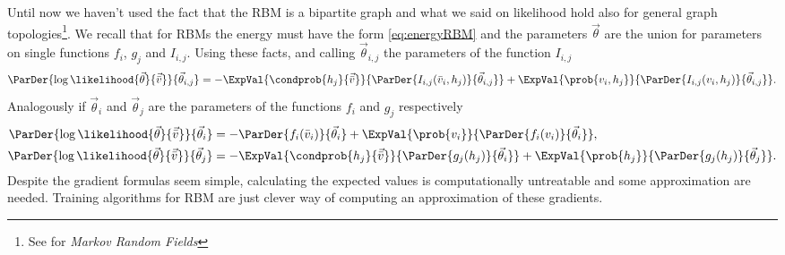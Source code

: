 \documentclass[]{article}
\begin{document}
  Until now we haven't used the fact that the RBM is a bipartite graph and what we said on likelihood
  hold also for general graph topologies\footnote{See \cite{fischer2012introduction} for \emph{Markov
  Random Fields}}.
  We recall that for RBMs the energy must have the form \eqref{eq:energyRBM} and the parameters \(\vec{\theta}\) are the union for parameters on single functions \(f_i\), \(g_j\) and \(I_{i,j}\).
  Using these facts, and calling \(\vec{\theta}_{i,j}\) the parameters of the function \(I_{i,j}\)
  \[
    \ParDer{\log\likelihood{\vec{\theta}}{\vec{\bar{v}}}}{\vec{\theta}_{i,j}} 
      = -\ExpVal{\condprob{h_j}{\vec{\bar{v}}}}{\ParDer{I_{i,j}(\bar{v}_i,h_j)}{\vec{\theta}_{i,j}}}
        +\ExpVal{\prob{v_i,h_j}}{\ParDer{I_{i,j}(v_i,h_j)}{\vec{\theta}_{i,j}}}.
  \]
  Analogously if \(\vec{\theta}_i\) and \(\vec{\theta}_j\) are the parameters of the functions
  \(f_i\) and \(g_j\) respectively
  \begin{align*}
    \ParDer{\log\likelihood{\vec{\theta}}{\vec{\bar{v}}}}{\vec{\theta}_i} 
    &= -\ParDer{f_i(\bar{v}_i)}{\vec{\theta}_i}
       +\ExpVal{\prob{v_i}}{\ParDer{f_i(v_i)}{\vec{\theta}_i}}, \\
    \ParDer{\log\likelihood{\vec{\theta}}{\vec{\bar{v}}}}{\vec{\theta}_j} 
    &= -\ExpVal{\condprob{h_j}{\vec{\bar{v}}}}{\ParDer{g_j(h_j)}{\vec{\theta}_i}}
       +\ExpVal{\prob{h_j}}{\ParDer{g_j(h_j)}{\vec{\theta}_j}}.
  \end{align*}
  Despite the gradient formulas seem simple, calculating the expected values is computationally
  untreatable and some approximation are needed. Training algorithms for RBM are just clever way
  of computing an approximation of these gradients.
  
\end{document}
